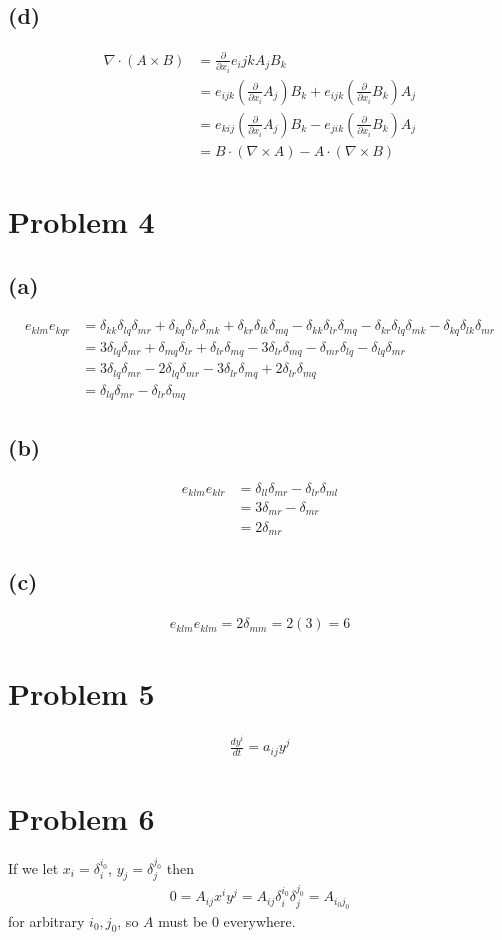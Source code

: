\documentclass[12pt]{article}
\newcommand{\eq}[1]{\begin{align*}#1\end{align*}}
\begin{document}
\subsection*{(d)}
\eq{
	\nabla \cdot (A\times B) &= \frac{\partial}{\partial x_i}e_ijkA_jB_k\\
	&= e_{ijk}(\frac{\partial}{\partial x_i}A_j)B_k + e_{ijk}(\frac{\partial}{\partial x_i}B_k)A_j\\
	&= e_{kij}(\frac{\partial}{\partial x_i}A_j)B_k - e_{jik}(\frac{\partial}{\partial x_i}B_k)A_j\\
	&= B\cdot(\nabla \times A) - A\cdot(\nabla \times B)
}
\section*{Problem 4}
\subsection*{(a)}
\eq{
	e_{klm}e_{kqr} &= \delta_{kk}\delta_{lq}\delta_{mr} + \delta_{kq}\delta_{lr}\delta_{mk} + \delta_{kr}\delta_{lk}\delta_{mq} - \delta_{kk}\delta_{lr}\delta_{mq} - \delta_{kr}\delta_{lq}\delta_{mk} - \delta_{kq}\delta_{lk}\delta_{mr}\\
	&= 3\delta_{lq}\delta_{mr} + \delta_{mq}\delta_{lr} + \delta_{lr}\delta_{mq} - 3\delta_{lr}\delta_{mq} - \delta_{mr}\delta_{lq} - \delta_{lq}\delta_{mr}\\
	&= 3\delta_{lq}\delta_{mr} - 2\delta_{lq}\delta_{mr} - 3\delta_{lr}\delta_{mq} + 2\delta_{lr}\delta_{mq}\\
	&= \delta_{lq}\delta_{mr} - \delta_{lr}\delta_{mq}
}
\subsection*{(b)}
\eq{
	e_{klm}e_{klr} &= \delta_{ll}\delta_{mr} - \delta_{lr}\delta_{ml}\\
	&= 3\delta_{mr} - \delta_{mr}\\
	&= 2\delta_{mr}
}
\subsection*{(c)}
\eq{
	e_{klm}e_{klm} = 2\delta_{mm} = 2(3) = 6
}
\section*{Problem 5}
\eq{
	\frac{dy^i}{dt} = a_{ij}y^j
}
\section*{Problem 6} If we let $x_i = \delta_i^{i_0}$, $y_j = \delta_j^{j_0}$ then
\eq{
	0 = A_{ij}x^iy^j = A_{ij}\delta_i^{i_0}\delta_j^{j_0} = A_{i_0j_0}
}
for arbitrary $i_0, j_0$, so $A$ must be 0 everywhere.
\end{document}

